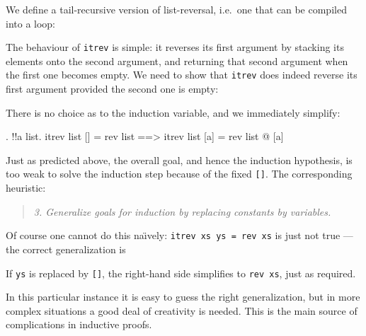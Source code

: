 We define a tail-recursive version of list-reversal,
i.e.\ one that can be compiled into a loop:
\begin{ttbox}
\end{ttbox}
The behaviour of \texttt{itrev} is simple: it reverses its first argument by
stacking its elements onto the second argument, and returning that second
argument when the first one becomes empty.
We need to show that \texttt{itrev} does indeed reverse its first argument
provided the second one is empty:
\begin{ttbox}
\end{ttbox}
There is no choice as to the induction variable, and we immediately simplify:
\begin{ttbox}
\ttbreak\makeatother
{. !!a list. itrev list [] = rev list\(\;\)==> itrev list [a] = rev list @ [a]}
\end{ttbox}
Just as predicted above, the overall goal, and hence the induction
hypothesis, is too weak to solve the induction step because of the fixed
\texttt{[]}. The corresponding heuristic:
\begin{quote}
{\em 3. Generalize goals for induction by replacing constants by variables.}
\end{quote}
Of course one cannot do this na\"{\i}vely: \texttt{itrev xs ys = rev xs} is
just not true --- the correct generalization is
\begin{ttbox}\makeatother
\end{ttbox}
If \texttt{ys} is replaced by \texttt{[]}, the right-hand side simplifies to
\texttt{rev xs}, just as required.

In this particular instance it is easy to guess the right generalization,
but in more complex situations a good deal of creativity is needed. This is
the main source of complications in inductive proofs.

